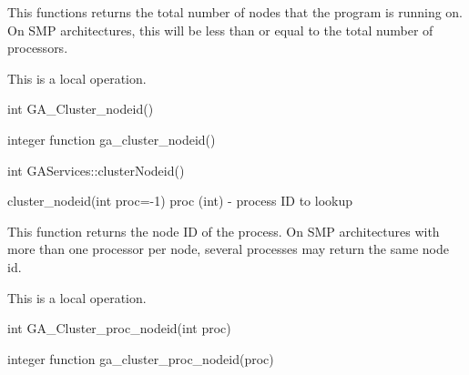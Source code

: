 \documentclass[12pt]{article}
\begin{document}
\begin{desc}


This functions returns the total number of nodes that the program is running 
on. On SMP architectures, this will be less than or equal to the total number 
of processors.

This is a  local operation.
\end{desc}


\begin{capi}
\begin{ccode}
int GA_Cluster_nodeid()
\end{ccode}
\end{capi}

\begin{fapi}
\begin{fcode}
integer function ga_cluster_nodeid()
\end{fcode}
\end{fapi}

\begin{cxxapi}
\begin{cxxcode}
int GAServices::clusterNodeid()
\end{cxxcode}
\end{cxxapi}

\begin{pyapi}
\begin{pycode}
cluster_nodeid(int proc=-1)  
   proc (int)    - process ID to lookup
\end{pycode}
\end{pyapi}

\begin{desc}

This function returns the node ID of the process. On SMP architectures with more 
than one processor per node, several processes may return the same node id.

This is a  local operation.
\end{desc}


\begin{capi}
\begin{ccode}
int GA_Cluster_proc_nodeid(int proc)
\end{ccode}
\begin{funcargs}
\end{funcargs}
\end{capi}

\begin{fapi}
\begin{fcode}
integer function ga_cluster_proc_nodeid(proc)
\end{fcode}
\begin{funcargs}
\end{funcargs}
\end{fapi}
\end{document}
